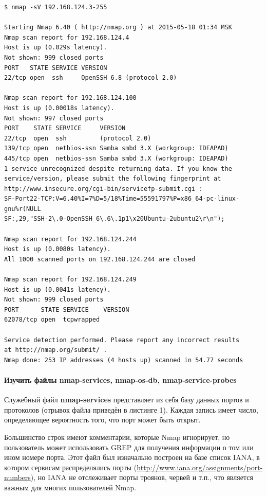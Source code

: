 \documentclass[a4paper, 12pt]{article}		%
\begin{document}
\begin{Verbatim}[frame=single]
$ nmap -sV 192.168.124.3-255

Starting Nmap 6.40 ( http://nmap.org ) at 2015-05-18 01:34 MSK
Nmap scan report for 192.168.124.4
Host is up (0.029s latency).
Not shown: 999 closed ports
PORT   STATE SERVICE VERSION
22/tcp open  ssh     OpenSSH 6.8 (protocol 2.0)

Nmap scan report for 192.168.124.100
Host is up (0.00018s latency).
Not shown: 997 closed ports
PORT    STATE SERVICE     VERSION
22/tcp  open  ssh         (protocol 2.0)
139/tcp open  netbios-ssn Samba smbd 3.X (workgroup: IDEAPAD)
445/tcp open  netbios-ssn Samba smbd 3.X (workgroup: IDEAPAD)
1 service unrecognized despite returning data. If you know the
service/version, please submit the following fingerprint at
http://www.insecure.org/cgi-bin/servicefp-submit.cgi :
SF-Port22-TCP:V=6.40%I=7%D=5/18%Time=55591797%P=x86_64-pc-linux-gnu%r(NULL
SF:,29,"SSH-2\.0-OpenSSH_6\.6\.1p1\x20Ubuntu-2ubuntu2\r\n");

Nmap scan report for 192.168.124.244
Host is up (0.0080s latency).
All 1000 scanned ports on 192.168.124.244 are closed

Nmap scan report for 192.168.124.249
Host is up (0.0041s latency).
Not shown: 999 closed ports
PORT      STATE SERVICE    VERSION
62078/tcp open  tcpwrapped

Service detection performed. Please report any incorrect results
at http://nmap.org/submit/ .
Nmap done: 253 IP addresses (4 hosts up) scanned in 54.77 seconds
\end{Verbatim}

\paragraph{Изучить файлы nmap-services, nmap-os-db, nmap-service-probes}

Служебный файл \textbf{nmap-services} представляет из себя базу данных портов и протоколов (отрывок файла приведён в листинге 1). Каждая запись имеет число, определяющее вероятность того, что порт может быть открыт.

Большинство строк имеют комментарии, которые Nmap игнорирует, но пользователь может использовать GREP для получения информации о том или ином номере порта. Этот файл был изначально построен на базе список IANA, в котором сервисам распределялись порты (\url{http://www.iana.org/assignments/port-numbers}), но IANA не отслеживает порты троянов, червей и т.п., что является важным для многих пользователей Nmap.
\end{document}
